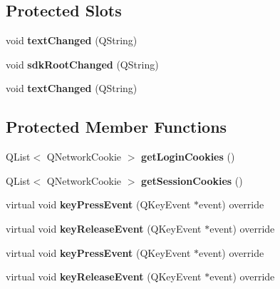 \subsection*{Protected Slots}
\begin{DoxyCompactItemize}
\item 
\mbox{\label{class_main_window_a05c1665ee3f4c90c364023f227423855}} 
void {\bfseries text\+Changed} (Q\+String)
\item 
\mbox{\label{class_main_window_a6b5f6b327ea1f0f67227f41acde443bb}} 
void {\bfseries sdk\+Root\+Changed} (Q\+String)
\item 
\mbox{\label{class_main_window_a05c1665ee3f4c90c364023f227423855}} 
void {\bfseries text\+Changed} (Q\+String)
\end{DoxyCompactItemize}
\subsection*{Protected Member Functions}
\begin{DoxyCompactItemize}
\item 
\mbox{\label{class_main_window_ae72f7f89500de8ab0583e5811ead67de}} 
Q\+List$<$ Q\+Network\+Cookie $>$ {\bfseries get\+Login\+Cookies} ()
\item 
\mbox{\label{class_main_window_a65569e861b178670d05a365b0b447536}} 
Q\+List$<$ Q\+Network\+Cookie $>$ {\bfseries get\+Session\+Cookies} ()
\item 
\mbox{\label{class_main_window_a55ae3e0d4303334ccabae0a5050cfd88}} 
virtual void {\bfseries key\+Press\+Event} (Q\+Key\+Event $\ast$event) override
\item 
\mbox{\label{class_main_window_a3e0426b08a8e5d4143a739ffe2b97f04}} 
virtual void {\bfseries key\+Release\+Event} (Q\+Key\+Event $\ast$event) override
\item 
\mbox{\label{class_main_window_afd8c0d5df6dcaadf0d7c5851287e37bb}} 
virtual void {\bfseries key\+Press\+Event} (Q\+Key\+Event $\ast$event) override
\item 
\mbox{\label{class_main_window_a6de36a9415c3a12f297b9917637ac05d}} 
virtual void {\bfseries key\+Release\+Event} (Q\+Key\+Event $\ast$event) override
\end{DoxyCompactItemize}


